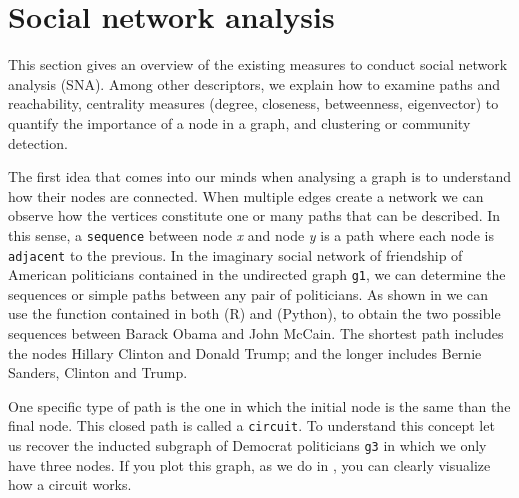 \section{Social network analysis}
\label{sec:sna}

This section gives an overview of the existing measures to conduct social network analysis (SNA). Among other descriptors, we explain how to examine paths and reachability, centrality measures (degree, closeness, betweenness, eigenvector) to quantify the importance of a node in a graph, and clustering or community detection.

The first idea that comes into our minds when analysing a graph is to understand how their nodes are connected. When multiple edges create a network we can observe how the vertices constitute one or many paths that can be described. In this sense, a \texttt{sequence} between node \textit{x} and node \textit{y} is a path where each node is \texttt{adjacent} to the previous. In the imaginary social network of friendship of American politicians contained in the undirected graph \texttt{g1}, we can determine the sequences or simple paths between any pair of politicians. As shown in  we can use the function  contained in both  (R) and  (Python), to obtain the two possible sequences between Barack Obama and John McCain. The shortest path includes the nodes Hillary Clinton and Donald Trump; and the longer includes Bernie Sanders, Clinton and Trump.


One specific type of path is the one in which the initial node is the same than the final node. This closed path is called a \texttt{circuit}. To understand this concept let us recover the inducted subgraph of Democrat politicians \texttt{g3} in which we only have three nodes. If you plot this graph, as we do in , you can clearly visualize how a circuit works. 


